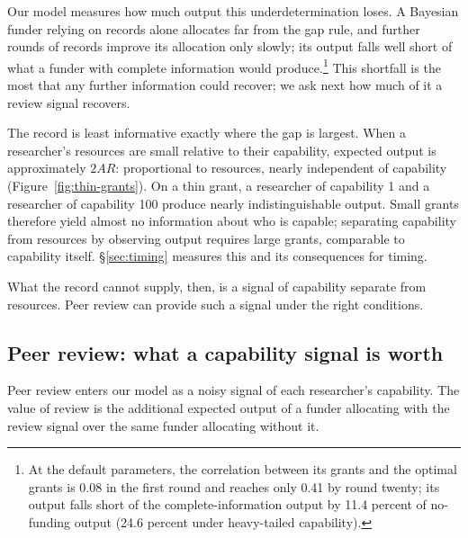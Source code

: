 \documentclass[article, 11pt, reqno]{amsart}
\theoremstyle{named}
\begin{document}
Our model measures how much output this underdetermination loses. A Bayesian funder relying on records alone allocates far from the gap rule, and further rounds of records improve its allocation only slowly; its output falls well short of what a funder with complete information would produce.\footnote{At the default parameters, the correlation between its grants and the optimal grants is 0.08 in the first round and reaches only 0.41 by round twenty; its output falls short of the complete-information output by 11.4 percent of no-funding output (24.6 percent under heavy-tailed capability).} This shortfall is the most that any further information could recover; we ask next how much of it a review signal recovers.

The record is least informative exactly where the gap is largest. When a researcher's resources are small relative to their capability, expected output is approximately $2AR$: proportional to resources, nearly independent of capability (Figure~\ref{fig:thin-grants}). On a thin grant, a researcher of capability 1 and a researcher of capability 100 produce nearly indistinguishable output. Small grants therefore yield almost no information about who is capable; separating capability from resources by observing output requires large grants, comparable to capability itself. \S\ref{sec:timing} measures this and its consequences for timing.



What the record cannot supply, then, is a signal of capability separate from resources. Peer review can provide such a signal under the right conditions.

\subsection*{Peer review: what a capability signal is worth}

Peer review enters our model as a noisy signal of each researcher's capability. The value of review is the additional expected output of a funder allocating with the review signal over the same funder allocating without it.
\end{document}
